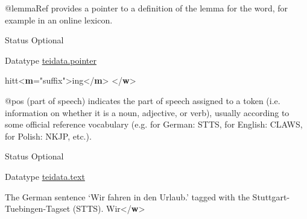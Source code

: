 \begin{reflist}
\begin{sansreflist}
\begin{reflist}
\end{reflist}  
    \item[@lemmaRef]
  provides a pointer to a definition of the lemma for the word, for example in an online lexicon.
\begin{reflist}
    \item[{Status}]
  Optional
    \item[{Datatype}]
  \hyperref[TEI.teidata.pointer]{teidata.pointer}
    \item[]hitt{<\textbf{m}\hspace*{1em}{type}="{suffix}">}ing{</\textbf{m}>}\mbox{}\newline 
{</\textbf{w}>}
\end{reflist}  
    \item[@pos]
  (part of speech) indicates the part of speech assigned to a token (i.e. information on whether it is a noun, adjective, or verb), usually according to some official reference vocabulary (e.g. for German: STTS, for English: CLAWS, for Polish: NKJP, etc.).
\begin{reflist}
    \item[{Status}]
  Optional
    \item[{Datatype}]
  \hyperref[TEI.teidata.text]{teidata.text}
    \item[]The German sentence ‘Wir fahren in den Urlaub.’ tagged with the Stuttgart-Tuebingen-Tagset (STTS).\mbox{}\newline 
{}Wir{</\textbf{w}>}\mbox{}\newline 

\end{reflist}
\end{sansreflist}
\end{reflist}
